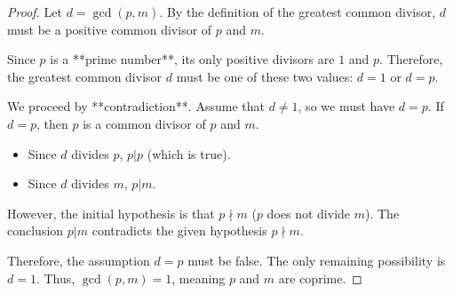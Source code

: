 \begin{proof}
Let $d = \gcd(p, m)$. By the definition of the greatest common divisor, $d$ must be a positive common divisor of $p$ and $m$.

Since $p$ is a **prime number**, its only positive divisors are $1$ and $p$.
Therefore, the greatest common divisor $d$ must be one of these two values: $d=1$ or $d=p$.

We proceed by **contradiction**. Assume that $d \ne 1$, so we must have $d=p$.
If $d=p$, then $p$ is a common divisor of $p$ and $m$.
\begin{itemize}
    \item Since $d$ divides $p$, $p|p$ (which is true).
    \item Since $d$ divides $m$, $p|m$.
\end{itemize}
However, the initial hypothesis is that $p \nmid m$ ($p$ does not divide $m$).
The conclusion $p|m$ contradicts the given hypothesis $p \nmid m$.

Therefore, the assumption $d=p$ must be false. The only remaining possibility is $d=1$.
Thus, $\gcd(p, m) = 1$, meaning $p$ and $m$ are coprime.
\end{proof}